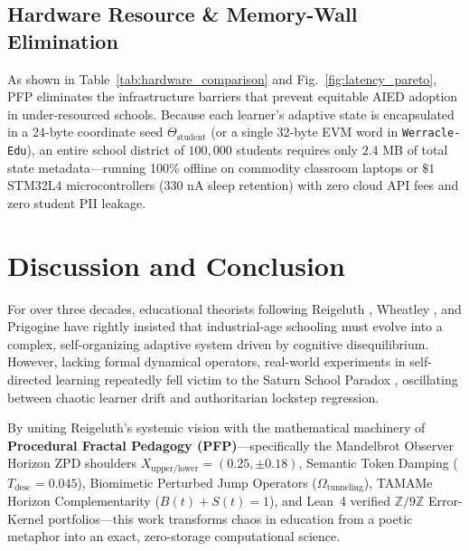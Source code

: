 \documentclass[10pt,twocolumn,a4paper]{article}
\begin{document}
\subsection{Hardware Resource \& Memory-Wall Elimination}
As shown in Table~\ref{tab:hardware_comparison} and Fig.~\ref{fig:latency_pareto}, PFP eliminates the infrastructure barriers that prevent equitable AIED adoption in under-resourced schools. Because each learner's adaptive state is encapsulated in a 24-byte coordinate seed $\Theta_{\text{student}}$ (or a single 32-byte EVM word in \texttt{Werracle-Edu}), an entire school district of $100,000$ students requires only $2.4\text{ MB}$ of total state metadata---running 100\% offline on commodity classroom laptops or $\$1$ STM32L4 microcontrollers ($330\text{ nA}$ sleep retention) with zero cloud API fees and zero student PII leakage.

\section{Discussion and Conclusion}

For over three decades, educational theorists following Reigeluth \cite{reigeluth2008chaos}, Wheatley \cite{wheatley1999leadership}, and Prigogine \cite{prigogine1984order} have rightly insisted that industrial-age schooling must evolve into a complex, self-organizing adaptive system driven by cognitive disequilibrium. However, lacking formal dynamical operators, real-world experiments in self-directed learning repeatedly fell victim to the Saturn School Paradox \cite{bennett1991saturn}, oscillating between chaotic learner drift and authoritarian lockstep regression.

By uniting Reigeluth's systemic vision with the mathematical machinery of \textbf{Procedural Fractal Pedagogy (PFP)}---specifically the Mandelbrot Observer Horizon ZPD shoulders $X_{\text{upper/lower}} = (0.25, \pm 0.18)$, Semantic Token Damping ($T_{\text{desc}} = 0.045$), Biomimetic Perturbed Jump Operators ($\Omega_{\text{tunneling}}$), TAMAMe Horizon Complementarity ($B(t)+S(t)=1$), and Lean~4 verified $\mathbb{Z}/9\mathbb{Z}$ Error-Kernel portfolios---this work transforms chaos in education from a poetic metaphor into an exact, zero-storage computational science.
\end{document}

